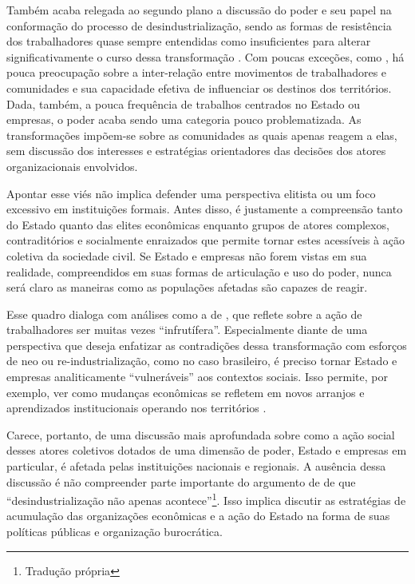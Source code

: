 Também acaba relegada ao segundo plano a discussão do poder e seu papel
na conformação do processo de desindustrialização, sendo as formas de
resistência dos trabalhadores quase sempre entendidas como insuficientes
para alterar significativamente o curso dessa transformação
\citep{high_fruitless_2022}. Com
poucas exceções, como \citet{berger_burdens_2017}, há pouca
preocupação sobre a inter-relação entre movimentos de trabalhadores e
comunidades e sua capacidade efetiva de influenciar os destinos dos
territórios. Dada, também, a pouca frequência de trabalhos centrados no
Estado ou empresas, o poder acaba sendo uma categoria pouco
problematizada. As transformações impõem-se sobre as comunidades as
quais apenas reagem a elas, sem discussão dos interesses e estratégias
orientadores das decisões dos atores organizacionais envolvidos.

Apontar esse viés não implica defender uma perspectiva elitista ou um
foco excessivo em instituições formais. Antes disso, é justamente a
compreensão tanto do Estado quanto das elites econômicas enquanto grupos
de atores complexos, contraditórios e socialmente enraizados que permite
tornar estes acessíveis à ação coletiva da sociedade civil. Se Estado e
empresas não forem vistas em sua realidade, compreendidos em suas formas
de articulação e uso do poder, nunca será claro as maneiras como as
populações afetadas são capazes de reagir.

Esse quadro dialoga com análises como a de \citet{high_fruitless_2022}, que reflete
sobre a ação de trabalhadores ser muitas vezes ``infrutífera''.
Especialmente diante de uma perspectiva que deseja enfatizar as
contradições dessa transformação com esforços de neo ou
re-industrialização, como no caso brasileiro, é preciso tornar Estado e
empresas analiticamente ``vulneráveis'' aos contextos sociais. Isso
permite, por exemplo, ver como mudanças econômicas se refletem em novos
arranjos e aprendizados institucionais operando nos territórios
.

Carece, portanto, de uma discussão mais aprofundada sobre como a ação
social desses atores coletivos dotados de uma dimensão de poder, Estado
e empresas em particular, é afetada pelas instituições nacionais e
regionais. A ausência dessa discussão é não compreender parte importante
do argumento de \citet[p.~15]{bluestone_deindustrialization_1982} de que
``desindustrialização não apenas acontece''\footnote{Tradução própria}.
Isso implica discutir as estratégias de acumulação das organizações
econômicas e a ação do Estado na forma de suas políticas públicas e
organização burocrática.

